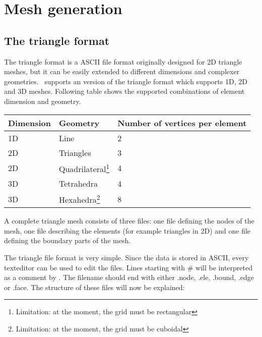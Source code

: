 \chapter{Mesh generation}\label{chap:meshes}

\section{The triangle format}\label{sect:triangle_format}
The triangle format is a ASCII file format originally designed for 2D
triangle meshes, but it can be easily extended to different dimensions and
complexer geometries.  \fluidity\ supports an version of the triangle format
which supports 1D, 2D and 3D meshes.  Following table shows the supported
combinations of element dimension and geometry.

\begin{tabular}{ l l l }
\textbf{Dimension} & \textbf{Geometry} & \textbf{Number of vertices per element} \\ \hline
1D & Line & 2\\ 
2D & Triangles &  3 \\ 
2D & Quadrilateral\footnote{Limitation: at the moment, the grid must be rectangular} & 4 \\
3D & Tetrahedra & 4 \\ 
3D & Hexahedra\footnote{Limitation: at the moment, the grid must be cuboidal} & 8 \\
\end{tabular}

A complete triangle mesh consists of three files: one file defining the
nodes of the mesh, one file describing the elements (for example triangles
in 2D) and one file defining the boundary parts of the mesh.

The triangle file format is very simple. Since the data is stored in ASCII,
every texteditor can be used to edit the files.  Lines starting with \# will
be interpreted as a comment by \fluidity.  The filename should end with
either .node, .ele, .bound, .edge or .face.  The structure of these files
will now be explained:

